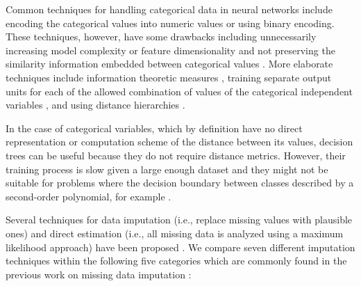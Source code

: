 \documentclass[10pt]{book}
\theoremstyle{definition}
\begin{document}
\lhead[\footnotesize\thepage\fancyplain{}\leftmark]{}\rhead[]{\fancyplain{}\rightmark\footnotesize\thepage}%

\setcounter{chapter}{2}
\setcounter{equation}{0} %


Common techniques for handling categorical data in
neural networks include encoding the categorical values into numeric values
or using binary encoding. These techniques, however, have some drawbacks
including unnecessarily increasing model complexity or feature dimensionality
and not preserving the similarity information embedded between categorical
values \citep{hsu2006generalizing}. More elaborate techniques include information theoretic measures
\citep{wang2008categorical}, training separate output units for
each of the allowed combination of values of the categorical independent
variables \citep{brouwer2002feed}, and using distance
hierarchies \citep{hsu2006generalizing}. 

In the case of categorical variables, which by definition have no direct
representation or computation scheme of the distance between its values,
decision trees can be useful because they do not require distance metrics.
However, their training process is slow given a large enough dataset and they
might not be suitable for problems where the decision boundary between classes
described by a second-order polynomial, for example \citep{fayyad1996data}.

 \label{section:techniques}
Several techniques for data imputation (i.e., replace missing values with plausible ones) and
direct estimation (i.e., all missing data is analyzed using a maximum likelihood
approach) have been proposed \citep{de2003prevention}. We compare seven different imputation techniques within the following five categories which are commonly found in the previous work on missing data imputation \citep{batista2003analysis}:
\end{document}
